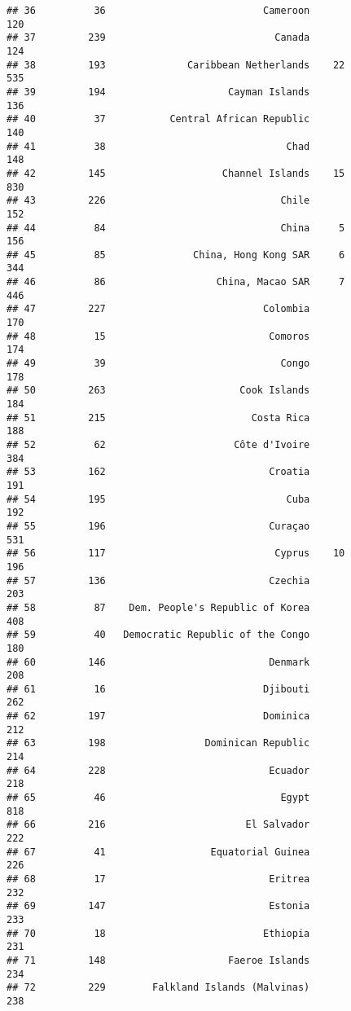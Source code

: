 \documentclass[]{article}
\begin{document}
\begin{verbatim}
## 36          36                           Cameroon                120
## 37         239                             Canada                124
## 38         193              Caribbean Netherlands    22          535
## 39         194                     Cayman Islands                136
## 40          37           Central African Republic                140
## 41          38                               Chad                148
## 42         145                    Channel Islands    15          830
## 43         226                              Chile                152
## 44          84                              China     5          156
## 45          85               China, Hong Kong SAR     6          344
## 46          86                   China, Macao SAR     7          446
## 47         227                           Colombia                170
## 48          15                            Comoros                174
## 49          39                              Congo                178
## 50         263                       Cook Islands                184
## 51         215                         Costa Rica                188
## 52          62                      Côte d'Ivoire                384
## 53         162                            Croatia                191
## 54         195                               Cuba                192
## 55         196                            Curaçao                531
## 56         117                             Cyprus    10          196
## 57         136                            Czechia                203
## 58          87    Dem. People's Republic of Korea                408
## 59          40   Democratic Republic of the Congo                180
## 60         146                            Denmark                208
## 61          16                           Djibouti                262
## 62         197                           Dominica                212
## 63         198                 Dominican Republic                214
## 64         228                            Ecuador                218
## 65          46                              Egypt                818
## 66         216                        El Salvador                222
## 67          41                  Equatorial Guinea                226
## 68          17                            Eritrea                232
## 69         147                            Estonia                233
## 70          18                           Ethiopia                231
## 71         148                     Faeroe Islands                234
## 72         229        Falkland Islands (Malvinas)                238

\end{verbatim}
\end{document}
